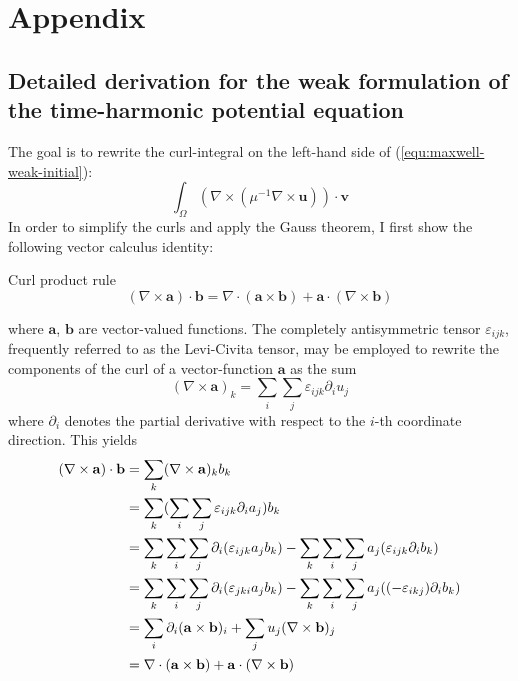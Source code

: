 \documentclass[11pt, a4paper]{article}
\begin{document}
\newpage


\newpage
\section{Appendix}
\label{sec:appendix}

\subsection{Detailed derivation for the weak formulation of the time-harmonic potential equation}
\label{subsec:derivation}

The goal is to rewrite the curl-integral on the left-hand side of 
(\ref{equ:maxwell-weak-initial}):
\begin{equation}
    \int_{\Omega} (\nabla \times (\mu^{-1} \nabla \times \mathbf{u})) \cdot \mathbf{v} \label{equ:maxwell-weak-initial-LHS}
\end{equation}
In order to simplify the curls and apply the Gauss theorem, I first show
the following vector calculus identity:
\begin{fancybox}{Curl product rule}
    \begin{equation}
        (\nabla \times \mathbf{a}) \cdot \mathbf{b} = \nabla \cdot (\mathbf{a} \times \mathbf{b}) + \mathbf{a} \cdot (\nabla \times \mathbf{b}) \label{equ:vector-calculus}
    \end{equation}
\end{fancybox}
where $\mathbf{a}$, $\mathbf{b}$ are vector-valued functions. The completely
antisymmetric tensor $\varepsilon_{ijk}$, frequently referred to as the
Levi-Civita tensor, may be employed to rewrite the components of the
curl of a vector-function $\mathbf{a}$ as the sum
\begin{equation}
    (\nabla \times \mathbf{a})_k = \sum_i \sum_j \varepsilon_{ijk} \partial_i u_j
\end{equation}
where $\partial_i$ denotes the partial derivative with respect to the $i$-th coordinate
direction. This yields
\begin{align}
    (\nabla \times \mathbf{a}) \cdot \mathbf{b} &= \sum_k (\nabla \times \mathbf{a})_k b_k \notag \\ 
    &= \sum_k (\sum_i \sum_j \varepsilon_{ijk} \partial_i a_j) b_k \notag \\ 
    &= \sum_k \sum_i \sum_j \partial_i (\varepsilon_{ijk} a_j b_k) - \sum_k \sum_i \sum_j a_j (\varepsilon_{ijk} \partial_i b_k) \notag \\ 
    &= \sum_k \sum_i \sum_j \partial_i (\varepsilon_{jki} a_j b_k) - \sum_k \sum_i \sum_j a_j ((-\varepsilon_{ikj}) \partial_i b_k) \notag \\ 
    &= \sum_i \partial_i (\mathbf{a} \times \mathbf{b})_i + \sum_j u_j (\nabla \times \mathbf{b})_j \notag \\ 
    &= \nabla \cdot (\mathbf{a} \times \mathbf{b}) + \mathbf{a} \cdot (\nabla \times \mathbf{b}) \label{equ:curlidentity} 
\end{align}
\end{document}
